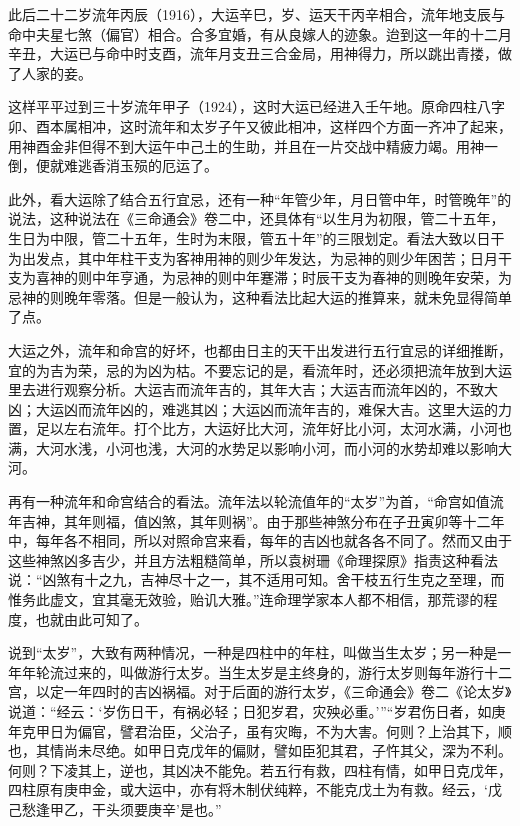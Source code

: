 \documentclass[a5paper,oneside,12pt]{ctexbook}
\begin{document}
此后二十二岁流年丙辰（1916），大运辛巳，岁、运天干丙辛相合，流年地支辰与命中夫星七煞（偏官）相合。合多宜婚，有从良嫁人的迹象。迨到这一年的十二月辛丑，大运已与命中时支酉，流年月支丑三合金局，用神得力，所以跳出青搂，做了人家的妾。

这样平平过到三十岁流年甲子（1924），这时大运已经进入壬午地。原命四柱八字卯、酉本属相冲，这时流年和太岁子午又彼此相冲，这样四个方面一齐冲了起来，用神酉金非但得不到大运午中己土的生助，并且在一片交战中精疲力竭。用神一倒，便就难逃香消玉殒的厄运了。

此外，看大运除了结合五行宜忌，还有一种“年管少年，月日管中年，时管晚年”的说法，这种说法在《三命通会》卷二中，还具体有“以生月为初限，管二十五年，生日为中限，管二十五年，生时为末限，管五十年”的三限划定。看法大致以日干为出发点，其中年柱干支为客神用神的则少年发达，为忌神的则少年困苦；日月干支为喜神的则中年亨通，为忌神的则中年蹇滞；时辰干支为春神的则晚年安荣，为忌神的则晚年零落。但是一般认为，这种看法比起大运的推算来，就未免显得简单了点。

大运之外，流年和命宫的好坏，也都由日主的天干出发进行五行宜忌的详细推断，宜的为吉为荣，忌的为凶为枯。不要忘记的是，看流年时，还必须把流年放到大运里去进行观察分析。大运吉而流年吉的，其年大吉；大运吉而流年凶的，不致大凶；大运凶而流年凶的，难逃其凶；大运凶而流年吉的，难保大吉。这里大运的力置，足以左右流年。打个比方，大运好比大河，流年好比小河，太河水满，小河也满，大河水浅，小河也浅，大河的水势足以影响小河，而小河的水势却难以影响大河。

再有一种流年和命宫结合的看法。流年法以轮流值年的“太岁”为首，“命宫如值流年吉神，其年则福，值凶煞，其年则祸”。由于那些神煞分布在子丑寅卯等十二年中，每年各不相同，所以对照命宫来看，每年的吉凶也就各各不同了。然而又由于这些神煞凶多吉少，并且方法粗糙简单，所以袁树珊《命理探原》指责这种看法说：“凶煞有十之九，吉神尽十之一，其不适用可知。舍干枝五行生克之至理，而惟务此虚文，宜其毫无效验，贻讥大雅。”连命理学家本人都不相信，那荒谬的程度，也就由此可知了。

说到“太岁”，大致有两种情况，一种是四柱中的年柱，叫做当生太岁；另一种是一年年轮流过来的，叫做游行太岁。当生太岁是主终身的，游行太岁则每年游行十二宫，以定一年四时的吉凶祸福。对于后面的游行太岁，《三命通会》卷二《论太岁》说道：“经云：‘岁伤日干，有祸必轻；日犯岁君，灾殃必重。’”“岁君伤日者，如庚年克甲日为偏官，譬君治臣，父治子，虽有灾晦，不为大害。何则？上治其下，顺也，其情尚未尽绝。如甲日克戊年的偏财，譬如臣犯其君，子忤其父，深为不利。何则？下凌其上，逆也，其凶决不能免。若五行有救，四柱有情，如甲日克戊年，四柱原有庚申金，或大运中，亦有将木制伏纯粹，不能克戊土为有救。经云，‘戊己愁逢甲乙，干头须要庚辛’是也。”
\end{document}

